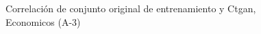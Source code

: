 \begin{figure}[H]
    \centering
    
    \caption{Correlación de conjunto original de entrenamiento y Ctgan, Economicos (A-3)}
    \label{pairwise-economicos-a-3-ctgan}
\end{figure}